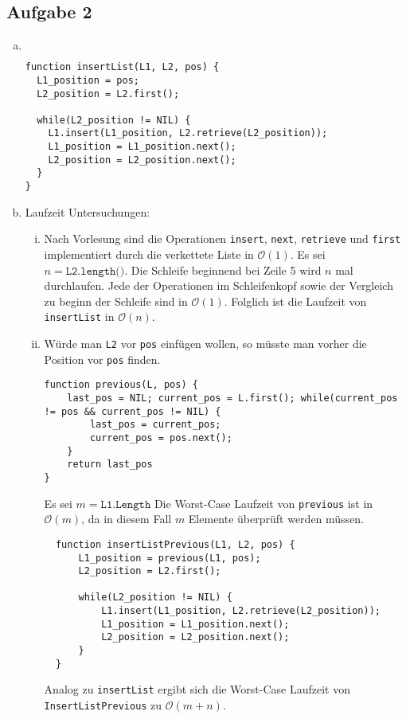 \documentclass[11pt]{article}
\begin{document}
\subsection*{Aufgabe 2}
\begin{enumerate}[a)]
  \item  $ $
\begin{center}
\begin{lstlisting}
function insertList(L1, L2, pos) {
  L1_position = pos;
  L2_position = L2.first();

  while(L2_position != NIL) {
    L1.insert(L1_position, L2.retrieve(L2_position));
    L1_position = L1_position.next();
    L2_position = L2_position.next();
  }
}
\end{lstlisting}
\end{center}
    
  \item Laufzeit Untersuchungen:
    \begin{enumerate}[i)]
      \item
        Nach Vorlesung sind die Operationen \texttt{insert}, \texttt{next}, 
        \texttt{retrieve} und \texttt{first} implementiert durch die verkettete
        Liste in $\mathcal{O}(1)$. Es sei $n=\texttt{L2.length()}$. 
        Die Schleife beginnend bei Zeile 5 wird $n$ mal durchlaufen. Jede der 
        Operationen im Schleifenkopf sowie der Vergleich zu beginn der Schleife
        sind in $\mathcal{O}(1)$. Folglich ist die Laufzeit von \texttt{insertList}
        in $\mathcal{O}(n)$.
      \item W\"urde man \texttt{L2} vor \texttt{pos} einf\"ugen wollen, so
        m\"usste man vorher die Position vor \texttt{pos} finden.
\begin{lstlisting}
function previous(L, pos) {
    last_pos = NIL; current_pos = L.first(); while(current_pos != pos && current_pos != NIL) {
        last_pos = current_pos;
        current_pos = pos.next();
    }
    return last_pos
}
\end{lstlisting}
        Es sei $m=\texttt{L1.Length}$ 
        Die Worst-Case Laufzeit von \texttt{previous} ist in $\mathcal{O}(m)$,
        da in diesem Fall $m$ Elemente \"uberpr\"uft werden m\"ussen. 

\begin{lstlisting}
  function insertListPrevious(L1, L2, pos) {
      L1_position = previous(L1, pos);
      L2_position = L2.first();
  
      while(L2_position != NIL) {
          L1.insert(L1_position, L2.retrieve(L2_position));
          L1_position = L1_position.next();
          L2_position = L2_position.next();
      }
  }
\end{lstlisting}
        
        Analog zu \texttt{insertList} ergibt sich die Worst-Case Laufzeit von
        \texttt{InsertListPrevious} zu $\mathcal{O}(m + n)$.

  \end{enumerate}
\end{enumerate}
\newpage
\end{document}
